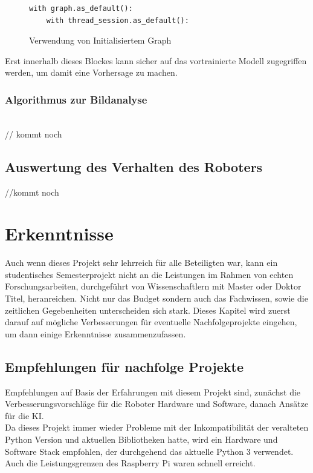 \documentclass[conference]{IEEEtran}
\begin{document}
\begin{figure}
	\centering
\begin{verbatim}
with graph.as_default():
	with thread_session.as_default():
\end{verbatim}
\label{with}
\caption{Verwendung von Initialisiertem Graph}
\end{figure}


Erst innerhalb dieses Blockes kann sicher auf das vortrainierte Modell zugegriffen werden, um damit eine Vorhersage zu machen.
\subsubsection{Algorithmus zur Bildanalyse }
\noindent \\
// kommt noch 
\subsection {Auswertung des Verhalten des Roboters}	%
//kommt noch


\section{Erkenntnisse }
Auch wenn dieses Projekt sehr lehrreich für alle Beteiligten war, kann ein studentisches Semesterprojekt nicht an die Leistungen im Rahmen von echten Forschungsarbeiten, durchgeführt von Wissenschaftlern mit Master oder Doktor Titel, heranreichen. Nicht nur das Budget sondern auch das Fachwissen, sowie die zeitlichen Gegebenheiten unterscheiden sich stark. Dieses Kapitel wird zuerst darauf auf mögliche Verbesserungen für eventuelle Nachfolgeprojekte eingehen, um dann einige Erkenntnisse zusammenzufassen. 

\subsection{Empfehlungen für nachfolge Projekte}

Empfehlungen auf Basis der Erfahrungen mit diesem Projekt sind, zunächst die Verbesserungsvorschläge für die Roboter Hardware und Software, danach Ansätze für die KI.\\
Da dieses Projekt immer wieder Probleme mit der Inkompatibilität der veralteten Python Version und aktuellen Bibliotheken hatte, wird ein Hardware und Software Stack empfohlen, der durchgehend das aktuelle Python 3 verwendet. Auch die Leistungsgrenzen des Raspberry Pi waren schnell erreicht. \\
\end{document}
